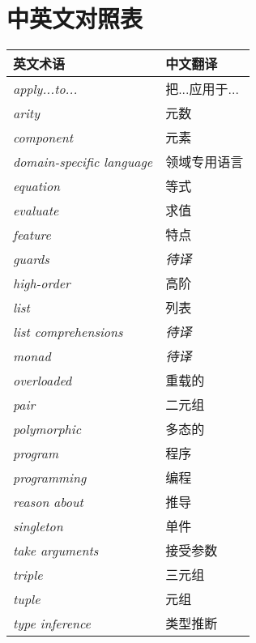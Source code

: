 \chapter*{中英文对照表}

\begin{table}[htbp]
\label{tab:threesome}
\centering
\begin{tabular}{ll}
\hline
英文术语 & 中文翻译 \\
\hline
\textit{apply...to...} & 把...应用于...\\
\textit{arity} & 元数 \\
\textit{component} & 元素 \\
\textit{domain-specific language} & 领域专用语言 \\
\textit{equation} & 等式 \\
\textit{evaluate} & 求值 \\
\textit{feature} & 特点 \\
\textit{guards} & \textit{待译} \\
\textit{high-order} & 高阶 \\
\textit{list} & 列表 \\
\textit{list comprehensions} & \textit{待译}\\
\textit{monad} & \textit{待译} \\
\textit{overloaded} & 重载的 \\
\textit{pair} & 二元组 \\
\textit{polymorphic} & 多态的 \\
\textit{program} & 程序 \\
\textit{programming} & 编程 \\
\textit{reason about} & 推导 \\
\textit{singleton} & 单件 \\
\textit{take arguments} & 接受参数 \\
\textit{triple} & 三元组 \\
\textit{tuple} & 元组 \\
\textit{type inference} & 类型推断 \\

\hline
\end{tabular}
\end{table}

